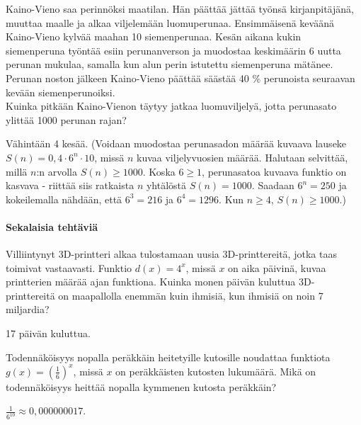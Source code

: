 \begin{tehtavasivu}
\begin{tehtava}
Kaino-Vieno saa perinnöksi maatilan. Hän päättää jättää työnsä kirjanpitäjänä, muuttaa maalle ja alkaa 
viljelemään luomuperunaa. Ensimmäisenä keväänä Kaino-Vieno kylvää maahan 10 siemenperunaa. Kesän aikana kukin siemenperuna 
työntää esiin perunanverson ja muodostaa keskimäärin 6 uutta perunan mukulaa, samalla kun alun perin istutettu 
siemenperuna mätänee. Perunan noston jälkeen Kaino-Vieno päättää säästää 40 \% perunoista seuraavan kevään siemenperunoiksi.\\
Kuinka pitkään Kaino-Vienon täytyy jatkaa luomuviljelyä, jotta perunasato ylittää 1000 perunan rajan? 
	\begin{vastaus}
	Vähintään 4 kesää. (Voidaan muodostaa perunasadon määrää kuvaava lauseke $S(n)=0,4\cdot6^n\cdot10$, missä $n$ kuvaa 
	viljelyvuosien määrää. Halutaan selvittää, millä $n$:n arvolla $S(n)\geq1000$. 
	Koska $6\geq1$, perunasatoa kuvaava funktio on kasvava - riittää siis ratkaista $n$ yhtälöstä $S(n)=1000$.
	Saadaan $6^n=250$ ja kokeilemalla nähdään, että $6^3=216$ ja $6^4=1296$. Kun $n\geq4$, $S(n)\geq1000$.)
	\end{vastaus}

\end{tehtava}

\paragraph*{Sekalaisia tehtäviä}

\begin{tehtava}
Villiintynyt 3D-printteri alkaa tulostamaan uusia 3D-printtereitä, jotka taas toimivat vastaavasti. Funktio $ d(x)=4^{x} $, missä $ x $ on aika päivinä, kuvaa printterien määrää ajan funktiona. Kuinka monen päivän kuluttua 3D-printtereitä on maapallolla enemmän kuin ihmisiä, kun ihmisiä on noin 7 miljardia?
\begin{vastaus}
17 päivän kuluttua.
\end{vastaus}
\end{tehtava}

\begin{tehtava}
Todennäköisyys nopalla peräkkäin heitetyille kutosille noudattaa funktiota 
$ g(x)=(\frac{1}{6})^{x} $, missä $ x $ on peräkkäisten kutosten lukumäärä.
Mikä on todennäköisyys heittää nopalla kymmenen kutosta peräkkäin?
\begin{vastaus}
$ \frac{1}{6^{10}}\approx0,000000017 $.
\end{vastaus}
\end{tehtava}


\end{tehtavasivu}

